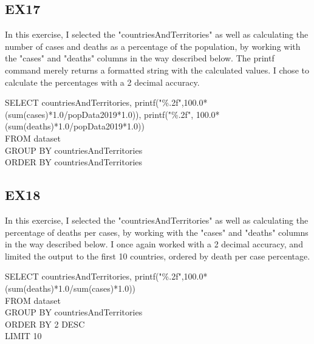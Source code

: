 \documentclass{article}
\begin{document}
\subsection{EX17}
In this exercise, I selected the "countriesAndTerritories" as well as calculating the number of cases and deaths as a percentage of the population, by working with the "cases" and "deaths" columns in the way described below. The printf command merely returns a formatted string with the calculated values. I chose to calculate the percentages with a 2 decimal accuracy.
\begin{algorithm}
SELECT countriesAndTerritories, printf("\%.2f",100.0*(sum(cases)*1.0/popData2019*1.0)), printf("\%.2f", 100.0*(sum(deaths)*1.0/popData2019*1.0)) \\
FROM dataset \\
GROUP BY countriesAndTerritories \\
ORDER BY countriesAndTerritories
\end{algorithm} \par

\subsection{EX18}
In this exercise, I selected the "countriesAndTerritories" as well as calculating the percentage of deaths per cases, by working with the "cases" and "deaths" columns in the way described below. I once again worked with a 2 decimal accuracy, and limited the output to the first 10 countries, ordered by death per case percentage.
\begin{algorithm}
SELECT countriesAndTerritories, printf("\%.2f",100.0*(sum(deaths)*1.0/sum(cases)*1.0)) \\
FROM dataset \\
GROUP BY countriesAndTerritories \\
ORDER BY 2 DESC \\
LIMIT 10
\end{algorithm} \par
\end{document}
